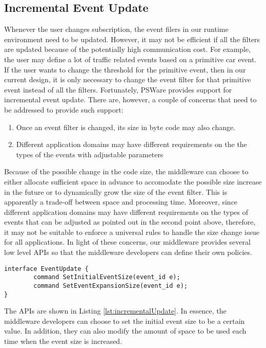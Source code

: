 \subsection{Incremental Event Update}
Whenever the user changes subscription, the event filers in our runtime environment need to be updated. However, it may not be efficient if all the filters are updated because of the potentially high communication cost. For example, the user may define a lot of traffic related events based on a primitive car event. If the user wants to change the threshold for the primitive event, then in our current design, it is only necessary to change the event filter for that primitive event instead of all the filters. Fortunately, PSWare provides support for incremental event update. There are, however, a couple of concerns that need to be addressed to provide such support:
\begin{enumerate}
\item Once an event filter is changed, its size in byte code may also change.
\item Different application domains may have different requirements on the the types of the events with adjustable parameters
\end{enumerate}
Because of the possible change in the code size, the middleware can choose to either allocate sufficient space in advance to accomodate the possible size increase in the future or to dynamically grow the size of the event filter. This is apparently a trade-off between space and processing time. Moreover, since different application domains may have different requirements on the types of events that can be adjusted as pointed out in the second point above, therefore, it may not be suitable to enforce a universal rules to handle the size change issue for all applications.  In light of these concerns, our middleware provides several low level APIs so that the middleware developers can define their own policies.

\begin{lstlisting}[caption=API for incremental event update, label=lst:incrementalUpdate]
interface EventUpdate {
        command SetInitialEventSize(event_id e);
        command SetEventExpansionSize(event_id e);
}
\end{lstlisting}

The APIs are shown in Listing \ref{lst:incrementalUpdate}. In essence, the middleware developers can choose to set the initial event size to be a certain value. In addition, they can also modify the amount of space to be used each time when the event size is increased.
